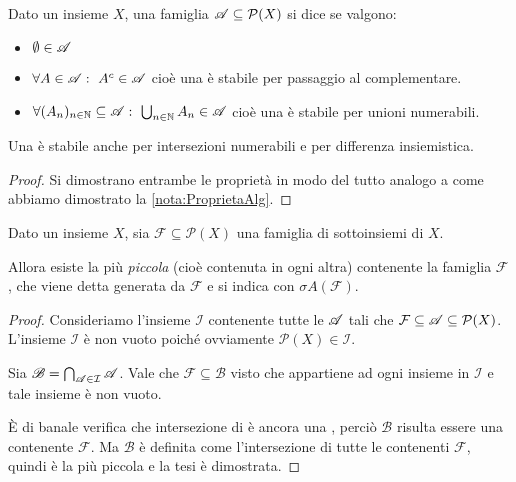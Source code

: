 \begin{definition}[\sigalg{}]
	Dato un insieme $X$, una famiglia $\mathscr A\subseteq\mathcal P(X)$ si dice \sigalg{} se valgono:
	\begin{itemize}
	\item $\emptyset\in \mathscr A$
	\item $\forall A\in \mathscr A:\ A^c\in \mathscr A$ cioè una \sigalg{} è stabile per passaggio al complementare.
	\item $\forall (A_n)_{n\in\N}\subseteq \A:\ \bigcup_{n\in\N} A_n\in \A$ cioè una \sigalg{} è stabile per unioni numerabili.  
	\end{itemize}
\end{definition}

\begin{remark}\label{nota:ProprietaSigAlg}
	Una \sigalg{} è stabile anche per intersezioni numerabili e per differenza insiemistica.
\end{remark}
\begin{proof}
	Si dimostrano entrambe le proprietà in modo del tutto analogo a come abbiamo dimostrato la \cref{nota:ProprietaAlg}.
\end{proof}

\begin{proposition}\label{prop:SigmaAlgGenerata}
	Dato un insieme $X$, sia $\mathcal F\subseteq\mathcal P(X)$ una famiglia di sottoinsiemi di $X$.
	
	Allora esiste la più \emph{piccola} (cioè contenuta in ogni altra) \sigalg{} contenente la famiglia $\mathcal F$, che viene detta \sigalg{} generata da $\mathcal F$ e si indica con $\sigma A(\mathcal F)$.
\end{proposition}
\begin{proof}
	Consideriamo l'insieme $\mathcal I$ contenente tutte le \sigalg[e] $\mathscr A$ tali che $\mathcal F\subseteq \mathscr A \subseteq \mathcal P(X)$.
	L'insieme $\mathcal I$ è non vuoto poiché ovviamente $\mathcal P(X)\in\mathcal I$.
	
	Sia $\mathscr B=\bigcap_{\mathscr A\in\mathcal I} \mathscr A$.
	Vale che $\mathcal F\subseteq \mathscr B$ visto che appartiene ad ogni insieme in $\mathcal I$ e tale insieme è non vuoto.
	
	È di banale verifica che intersezione di \sigalg[e] è ancora una \sigalg{}, perciò $\mathscr B$ risulta essere una \sigalg{} contenente $\mathcal F$. Ma $\mathscr B$ è definita come l'intersezione di tutte le \sigalg{} contenenti $\mathcal F$, quindi è la più piccola e la tesi è dimostrata.
\end{proof}


